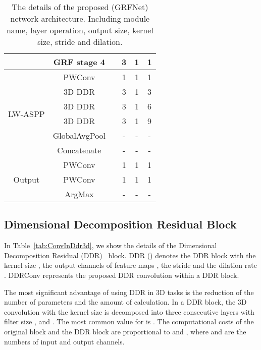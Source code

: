 \documentclass[10pt,twocolumn,letterpaper]{article}
\begin{document}
\begin{table*}[!htbp]
\begin{center}
{\begin{tabular}{c|c|c|c|c|c}
                                    & GRF stage 4       &    & 3         & 1         & 1     \\ \hline
\multirow{6}{*}{LW-ASPP}            & PWConv            &    & 1         & 1         & 1     \\ \cline{2-6} 
                                    & 3D DDR            &    & 3         & 1         & 3     \\ \cline{2-6} 
                                    & 3D DDR            &    & 3         & 1         & 6     \\ \cline{2-6} 
                                    & 3D DDR            &    & 3         & 1         & 9     \\ \cline{2-6} 
                                    & GlobalAvgPool     &    & -         & -         & -     \\ \cline{2-6} 
                                    & Concatenate       &   & -         & -         & -     \\ \hline
\multirow{4}{*}{Output}             & PWConv            &   & 1         & 1         & 1     \\ \cline{2-6} 
                                    & PWConv            &   & 1         & 1         & 1     \\ \cline{2-6} 
                                    & ArgMax            &    & -         & -         & -     \\ \hline
\end{tabular}
}


\end{center}
\caption{The details of the proposed (GRFNet) network architecture. Including module name, layer operation, output size, kernel
size, stride and dilation.}
\vspace{0.3cm}
\label{tab:networkdetails}
\end{table*}



\subsection{Dimensional Decomposition Residual Block}
In Table~\ref{tab:ConvInDdr3d}, we show the details of the Dimensional Decomposition Residual (DDR)~\cite{li2019rgbd} block. DDR () denotes the DDR block with the kernel size , the output channels of feature maps , the stride  and the dilation rate . 
DDRConv represents the proposed DDR convolution within a DDR block.

The most significant advantage of using DDR in 3D tasks is the reduction of the number of parameters and the amount of calculation.
In a DDR block, the 3D convolution with the kernel size  is decomposed into three consecutive layers with filter size ,  and . The most common value for  is .
The computational costs of the original block and the DDR block are proportional to  and , where  and  are the numbers of input and output channels. 
\end{document}
